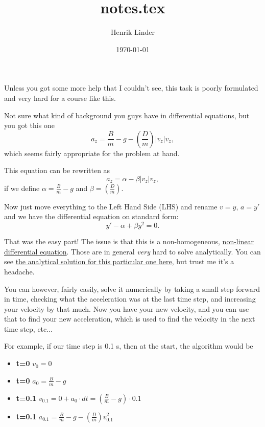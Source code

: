 \documentclass{article}
\title{notes.tex }
\author{Henrik Linder}
\date{\today}
\begin{document}
\maketitle

Unless you got some more help that I couldn't see, this task is poorly formulated and very hard for a course like this.

Not sure what kind of background you guys have in differential equations, but you got this one
\begin{equation}
	a_z = \frac{B}{m} - g - \left(\frac{D}{m}\right)  \left| v_z\right| v_z, 
\end{equation}
which seems fairly appropriate for the problem at hand.

This equation can be rewritten as 
\begin{equation}
	a_z = \alpha - \beta  \left| v_z\right| v_z, 
\end{equation}
if we define $\alpha = \frac{B}{m} - g$ and $\beta = \left(\frac{D}{m}\right)$. 

Now just move everything to the Left Hand Side (LHS) and rename $v = y$, $a = y'$ and we have the differential equation on standard form: 
\begin{equation}
	y' - \alpha + \beta y^2 = 0 .
\end{equation}

That was the easy part! The issue is that this is a non-homogeneous, \href{https://en.wikipedia.org/wiki/Differential\_equation#Non-linear\_differential\_equations}{non-linear differential equation}. Those are in general \textit{very} hard to solve analytically. You can see \href{https://www.wolframalpha.com/input?i=y\%27++-+alpha+\%2B+beta+*+y\%5E2+\%3D+0}{the analytical solution for this particular one here}, but trust me it's a headache. 


You can however, fairly easily, solve it numerically by taking a small step forward in time, checking what the acceleration was at the last time step, and increasing your velocity by that much. Now you have your new velocity, and you can use that to find your new acceleration, which is used to find the velocity in the next time step, etc... 

For example, if our time step is 0.1 s, then at the start, the algorithm would be 
\begin{itemize}
	\item \textbf{t=0   \quad   }    $v_0=0$
	\item \textbf{t=0   \quad   }    $a_0=\frac{B}{m} - g$
	\item \textbf{t=0.1\quad}  $v_{0.1}=0+a_0\cdot dt = (\frac{B}{m} - g)\cdot 0.1$
	\item \textbf{t=0.1\quad}  $a_{0.1}=\frac{B}{m} - g - \left(\frac{D}{m}\right) v_{0.1}^2$
\end{itemize}
\end{document}
